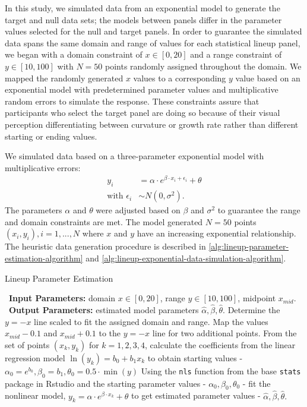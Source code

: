 \documentclass[12pt]{article}
\begin{document}
In this study, we simulated data from an exponential model to generate
the target and null data sets; the models between panels differ in the
parameter values selected for the null and target panels. In order to
guarantee the simulated data spans the same domain and range of values
for each statistical lineup panel, we began with a domain constraint of
\(x\in [0,20]\) and a range constraint of \(y\in [10,100]\) with
\(N = 50\) points randomly assigned throughout the domain. We mapped the
randomly generated \(x\) values to a corresponding \(y\) value based on
an exponential model with predetermined parameter values and
multiplicative random errors to simulate the response. These constraints
assure that participants who select the target panel are doing so
because of their visual perception differentiating between curvature or
growth rate rather than different starting or ending values.

We simulated data based on a three-parameter exponential model with
multiplicative errors: \begin{align}
y_i & = \alpha\cdot e^{\beta\cdot x_i + \epsilon_i} + \theta \\
\text{with } \epsilon_i & \sim N(0, \sigma^2). \nonumber
\end{align} The parameters \(\alpha\) and \(\theta\) were adjusted based
on \(\beta\) and \(\sigma^2\) to guarantee the range and domain
constraints are met. The model generated \(N = 50\) points
\((x_i, y_i), i = 1,...,N\) where \(x\) and \(y\) have an increasing
exponential relationship. The heuristic data generation procedure is
described in \cref{alg:lineup-parameter-estimation-algorithm} and
\cref{alg:lineup-exponential-data-simulation-algorithm}.

\begin{algorithm}
  \caption{Lineup Parameter Estimation}\label{alg:lineup-parameter-estimation-algorithm}
  \begin{algorithmic}[1]
    \Statex \textbullet~\textbf{Input Parameters:} domain $x\in[0,20]$, range $y\in[10,100]$, midpoint $x_{mid}$.
    \Statex \textbullet~\textbf{Output Parameters:} estimated model parameters $\hat\alpha, \hat\beta, \hat\theta$.
    \State Determine the $y=-x$ line scaled to fit the assigned domain and range.
    \State Map the values $x_{mid} - 0.1$ and $x_{mid} + 0.1$ to the $y=-x$ line for two additional points.
    \State From the set of points $(x_k, y_k)$ for $k = 1,2,3,4$, calculate the coefficients from the linear regression model $\ln(y_k) = b_0 +b_1x_k$ to obtain starting values - $\alpha_0 = e^{b_0}, \beta_0 =  b_1, \theta_0 = 0.5\cdot \min(y)$
    \State Using the \texttt{nls} function from the base \texttt{stats} package in Rstudio and the starting parameter values - $\alpha_0, \beta_0, \theta_0$ - fit the nonlinear model, $y_k = \alpha\cdot e^{\beta\cdot x_k}+\theta$ to get estimated parameter values - $\hat\alpha, \hat\beta, \hat\theta.$
  \end{algorithmic}
\end{algorithm}
\end{document}
